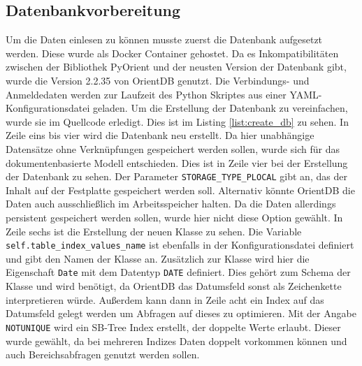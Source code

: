 
\subsection{Datenbankvorbereitung}

Um die Daten einlesen zu können musste zuerst die Datenbank aufgesetzt werden. Diese wurde als Docker Container gehostet. Da es Inkompatibilitäten zwischen der Bibliothek PyOrient und der neusten Version der Datenbank gibt, wurde die Version 2.2.35 von OrientDB genutzt. Die Verbindungs- und Anmeldedaten werden zur Laufzeit des Python Skriptes aus einer \gls{YAML}-Konfigurationsdatei geladen. Um die Erstellung der Datenbank zu vereinfachen, wurde sie im Quellcode erledigt. Dies ist im Listing \ref{list:create_db} zu sehen. In Zeile eins bis vier wird die Datenbank neu erstellt. Da hier unabhängige Datensätze ohne Verknüpfungen gespeichert werden sollen, wurde sich für das dokumentenbasierte Modell entschieden. Dies ist in Zeile vier bei der Erstellung der Datenbank zu sehen. Der Parameter \texttt{STORAGE\_TYPE\_PLOCAL} gibt an, das der Inhalt auf der Festplatte gespeichert werden soll. Alternativ könnte OrientDB die Daten auch ausschließlich im Arbeitsspeicher halten. Da die Daten allerdings persistent gespeichert werden sollen, wurde hier nicht diese Option gewählt. In Zeile sechs ist die Erstellung der neuen Klasse zu sehen. Die Variable \texttt{self.table\_index\_values\_name} ist ebenfalls in der Konfigurationsdatei definiert und gibt den Namen der Klasse an. Zusätzlich zur Klasse wird hier die Eigenschaft \texttt{Date} mit dem Datentyp \texttt{DATE} definiert. Dies gehört zum Schema der Klasse und wird benötigt, da OrientDB das Datumsfeld sonst als Zeichenkette interpretieren würde. Außerdem kann dann in Zeile acht ein Index auf das Datumsfeld gelegt werden um Abfragen auf dieses zu optimieren. Mit der Angabe \texttt{NOTUNIQUE} wird ein SB-Tree Index erstellt, der doppelte Werte erlaubt. Dieser wurde gewählt, da bei mehreren Indizes Daten doppelt vorkommen können und auch Bereichsabfragen genutzt werden sollen.

